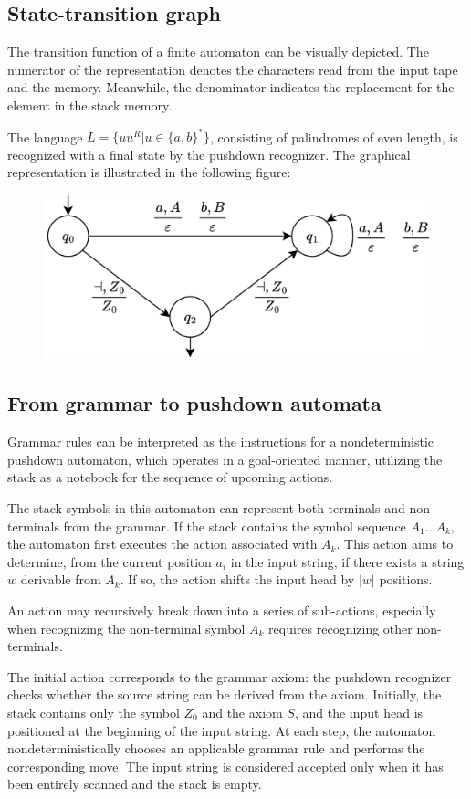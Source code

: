 \subsection{State-transition graph}
The transition function of a finite automaton can be visually depicted. 
The numerator of the representation denotes the characters read from the input tape and the memory. 
Meanwhile, the denominator indicates the replacement for the element in the stack memory.
\begin{example}
    The language $L=\{uu^R|u \in \{a,b\}^{*}\}$, consisting of palindromes of even length, is recognized with a final state by the pushdown recognizer. 
    The graphical representation is illustrated in the following figure:
    \begin{figure}[H]
        \centering
        \includegraphics[width=0.6\linewidth]{images/pda.png}
    \end{figure}
\end{example}

\subsection{From grammar to pushdown automata}
Grammar rules can be interpreted as the instructions for a nondeterministic pushdown automaton, which operates in a goal-oriented manner, utilizing the stack as a notebook for the sequence of upcoming actions.

The stack symbols in this automaton can represent both terminals and non-terminals from the grammar.
If the stack contains the symbol sequence $A_1 \dots A_k$, the automaton first executes the action associated with $A_k$. 
This action aims to determine, from the current position $a_i$ in the input string, if there exists a string $w$ derivable from $A_k$.
If so, the action shifts the input head by $\left\lvert w\right\rvert$ positions.

An action may recursively break down into a series of sub-actions, especially when recognizing the non-terminal symbol $A_k$ requires recognizing other non-terminals.

The initial action corresponds to the grammar axiom: the pushdown recognizer checks whether the source string can be derived from the axiom.
Initially, the stack contains only the symbol $Z_0$ and the axiom $S$, and the input head is positioned at the beginning of the input string.
At each step, the automaton nondeterministically chooses an applicable grammar rule and performs the corresponding move.
The input string is considered accepted only when it has been entirely scanned and the stack is empty.

